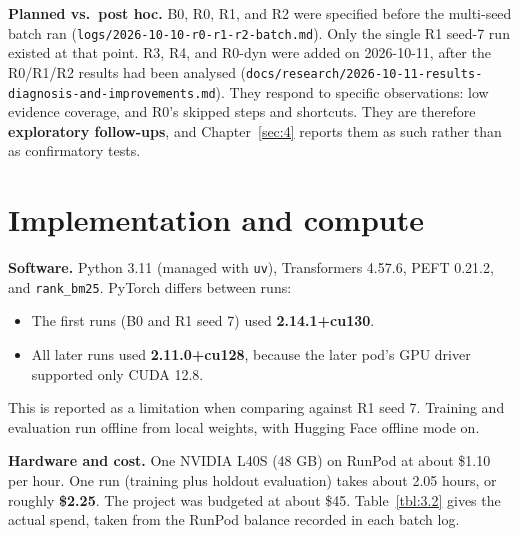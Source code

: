 \textbf{Planned vs.~post hoc.} B0, R0, R1, and R2 were specified before
the multi-seed batch ran
(\texttt{logs/\allowbreak{}2026-\allowbreak{}10-\allowbreak{}10-\allowbreak{}r0-\allowbreak{}r1-\allowbreak{}r2-\allowbreak{}batch.\allowbreak{}md}).
Only the single R1 seed-7 run existed at that point. R3, R4, and R0-dyn
were added on 2026-10-11, after the R0/R1/R2 results had been analysed
(\texttt{docs/\allowbreak{}research/\allowbreak{}2026-\allowbreak{}10-\allowbreak{}11-\allowbreak{}results-\allowbreak{}diagnosis-\allowbreak{}and-\allowbreak{}improvements.\allowbreak{}md}).
They respond to specific observations: low evidence coverage, and R0's
skipped steps and shortcuts. They are therefore \textbf{exploratory
follow-ups}, and Chapter~\ref{sec:4} reports them as such rather than as
confirmatory tests.

\section{Implementation and compute}\label{sec:3.9}

\textbf{Software.} Python 3.11 (managed with \texttt{uv}), Transformers
4.57.6, PEFT 0.21.2, and \texttt{rank\_\allowbreak{}bm25}. PyTorch
differs between runs:

\begin{itemize}
\tightlist
\item
  The first runs (B0 and R1 seed 7) used \textbf{2.14.1+cu130}.
\item
  All later runs used \textbf{2.11.0+cu128}, because the later pod's GPU
  driver supported only CUDA 12.8.
\end{itemize}

This is reported as a limitation when comparing against R1 seed 7.
Training and evaluation run offline from local weights, with Hugging
Face offline mode on.

\textbf{Hardware and cost.} One NVIDIA L40S (48 GB) on RunPod at about
\$1.10 per hour. One run (training plus holdout evaluation) takes about
2.05 hours, or roughly \textbf{\$2.25}. The project was budgeted at
about \$45. Table~\ref{tbl:3.2} gives the actual spend, taken from the
RunPod balance recorded in each batch log.

